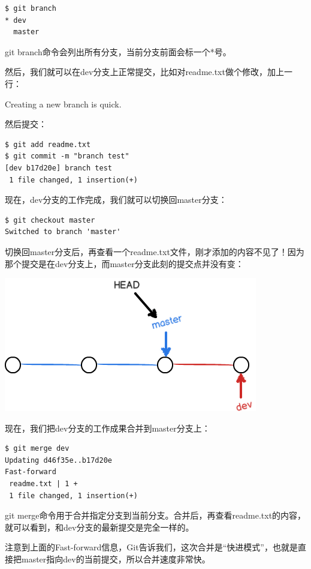 \documentclass[•]{article}
\begin{document}
\begin{CJK}{UTF8}{gbsn}
\begin{lstlisting}
$ git branch
* dev
  master
\end{lstlisting}

git branch命令会列出所有分支，当前分支前面会标一个*号。

然后，我们就可以在dev分支上正常提交，比如对readme.txt做个修改，加上一行：

Creating a new branch is quick.

然后提交：

\begin{lstlisting}
$ git add readme.txt 
$ git commit -m "branch test"
[dev b17d20e] branch test
 1 file changed, 1 insertion(+)
\end{lstlisting}

现在，dev分支的工作完成，我们就可以切换回master分支：
\begin{lstlisting}
$ git checkout master
Switched to branch 'master'
\end{lstlisting}
切换回master分支后，再查看一个readme.txt文件，刚才添加的内容不见了！因为那个提交是在dev分支上，而master分支此刻的提交点并没有变：

\begin{center}
\includegraphics[scale=0.6]{head6.png}\\
\end{center}
现在，我们把dev分支的工作成果合并到master分支上：

\begin{lstlisting}
$ git merge dev
Updating d46f35e..b17d20e
Fast-forward
 readme.txt | 1 +
 1 file changed, 1 insertion(+)
\end{lstlisting}

git merge命令用于合并指定分支到当前分支。合并后，再查看readme.txt的内容，就可以看到，和dev分支的最新提交是完全一样的。

注意到上面的Fast-forward信息，Git告诉我们，这次合并是“快进模式”，也就是直接把master指向dev的当前提交，所以合并速度非常快。


\end{CJK}
\end{document}
